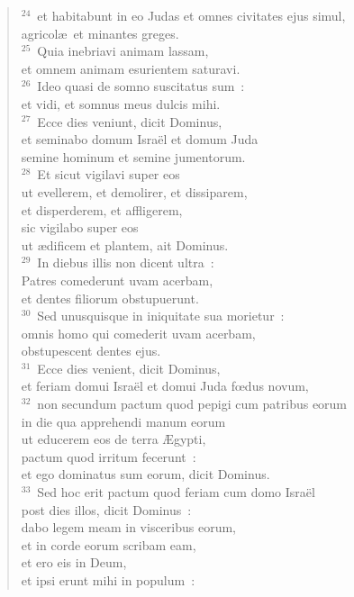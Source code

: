 \begin{flushleft}
\begin{verse}
${}^{24}$~et habitabunt in eo Judas et omnes civitates ejus simul,\\ agricol\ae\ et minantes greges.\\
${}^{25}$~Quia inebriavi animam lassam,\\ et omnem animam esurientem saturavi.\\
${}^{26}$~Ideo quasi de somno suscitatus sum~:\\ et vidi, et somnus meus dulcis mihi.\\
${}^{27}$~Ecce dies veniunt, dicit Dominus,\\ et seminabo domum Isra\"el et domum Juda\\ semine hominum et semine jumentorum.\\
${}^{28}$~Et sicut vigilavi super eos\\ ut evellerem, et demolirer, et dissiparem,\\ et disperderem, et affligerem,\\ sic vigilabo super eos\\ ut \ae dificem et plantem, ait Dominus.\\
${}^{29}$~In diebus illis non dicent ultra~:\\ Patres comederunt uvam acerbam,\\ et dentes filiorum obstupuerunt.\\
${}^{30}$~Sed unusquisque in iniquitate sua morietur~:\\ omnis homo qui comederit uvam acerbam,\\ obstupescent dentes ejus.\\
${}^{31}$~Ecce dies venient, dicit Dominus,\\ et feriam domui Isra\"el et domui Juda fœdus novum,\\
${}^{32}$~non secundum pactum quod pepigi cum patribus eorum\\ in die qua apprehendi manum eorum\\ ut educerem eos de terra \AE gypti,\\ pactum quod irritum fecerunt~:\\ et ego dominatus sum eorum, dicit Dominus.\\
${}^{33}$~Sed hoc erit pactum quod feriam cum domo Isra\"el\\ post dies illos, dicit Dominus~:\\ dabo legem meam in visceribus eorum,\\ et in corde eorum scribam eam,\\ et ero eis in Deum,\\ et ipsi erunt mihi in populum~:\\

\end{verse}
\end{flushleft}
